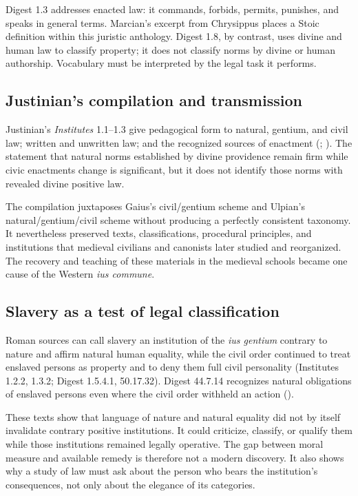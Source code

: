Digest 1.3 addresses enacted law: it commands, forbids, permits, punishes, and speaks in general terms. Marcian's excerpt from Chrysippus places a Stoic definition within this juristic anthology. Digest 1.8, by contrast, uses divine and human law to classify property; it does not classify norms by divine or human authorship. Vocabulary must be interpreted by the legal task it performs.

\subsection{Justinian's compilation and transmission}

Justinian's \emph{Institutes} 1.1--1.3 give pedagogical form to natural, gentium, and civil law; written and unwritten law; and the recognized sources of enactment (; ). The statement that natural norms established by divine providence remain firm while civic enactments change is significant, but it does not identify those norms with revealed divine positive law.

The compilation juxtaposes Gaius's civil/gentium scheme and Ulpian's natural/gentium/civil scheme without producing a perfectly consistent taxonomy. It nevertheless preserved texts, classifications, procedural principles, and institutions that medieval civilians and canonists later studied and reorganized. The recovery and teaching of these materials in the medieval schools became one cause of the Western \emph{ius commune}.

\subsection{Slavery as a test of legal classification}

Roman sources can call slavery an institution of the \emph{ius gentium} contrary to nature and affirm natural human equality, while the civil order continued to treat enslaved persons as property and to deny them full civil personality (Institutes 1.2.2, 1.3.2; Digest 1.5.4.1, 50.17.32). Digest 44.7.14 recognizes natural obligations of enslaved persons even where the civil order withheld an action ().

These texts show that language of nature and natural equality did not by itself invalidate contrary positive institutions. It could criticize, classify, or qualify them while those institutions remained legally operative. The gap between moral measure and available remedy is therefore not a modern discovery. It also shows why a study of law must ask about the person who bears the institution's consequences, not only about the elegance of its categories.

